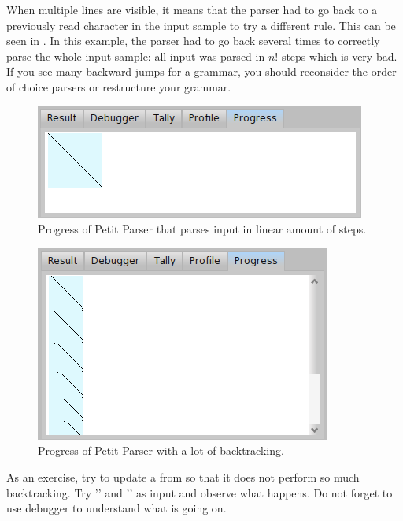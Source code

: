\documentclass[a4paper,10pt,twoside]{book}
\begin{document}
\begin{description}
  When multiple lines are visible, it means that the parser had
  to go back to a previously read character in the input sample to try
  a different rule. This can be seen in
  . In this example, the parser had to
  go back several times to correctly parse the whole input sample: all
  input was parsed in $n!$ steps which is very bad. %
  If you see many backward jumps for a grammar, you should
  reconsider the order of choice parsers or restructure your grammar.

  \begin{figure}[ht]
    \begin{center}
      \includegraphics[scale=0.5]{PPBrowserProgressLinear}
      \caption{Progress of Petit Parser that parses input in linear amount of steps. \label{fig:pp/progressLinear}}
    \end{center}
  \end{figure}

  \begin{figure}[ht]
    \begin{center}
      \includegraphics[scale=0.5]{PPBrowserProgressBacktracking}
      \caption{Progress of Petit Parser with a lot of backtracking. \label{fig:pp/progressBacktracking}}
    \end{center}
  \end{figure}

  As an exercise, try to update a  from  
    so that it does not perform so much backtracking.
  Try '' and '' as input and observe what happens.
  Do not forget to use debugger to understand what is going on. 

\end{description}
\end{document}
